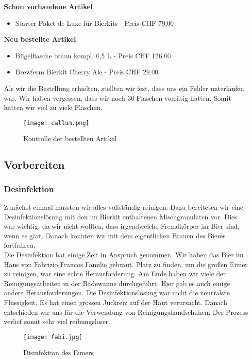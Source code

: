 \textbf{Schon vorhandene Artikel}
\begin{itemize}
	\item Starter-Paket de Luxe für Bierkits - Preis CHF 79.00
\end{itemize}
\textbf{Neu bestellte Artikel}
\begin{itemize}
	\item Bügelflasche braun kompl. 0,5 L - Preis CHF 126.00
	\item Brewferm Bierkit Cherry Ale - Preis CHF 29.00
\end{itemize}

Als wir die Bestellung erhielten, stellten wir fest, dass uns ein Fehler unterlaufen war.
Wir haben vergessen, dass wir noch 30 Flaschen vorrätig hatten.
Somit hatten wir viel zu viele Flaschen.

 \begin{figure}[!h]
	\centering
	\texttt{[image: callum.png]}
	\caption{Kontrolle der bestellten Artikel}
\end{figure}
\newpage
\subsection{Vorbereiten}
\subsubsection{Desinfektion}
Zunächst einmal mussten wir alles vollständig reinigen.
Dazu bereiteten wir eine Desinfektionslösung mit den im Bierkit enthaltenen Mischgranulaten vor.
Dies war wichtig, da wir nicht wollten, dass irgendwelche Fremdkörper im Bier sind, wenn es gärt.
Danach konnten wir mit dem eigentlichen Brauen des Bieres fortfahren. \\

Die Desinfektion hat einige Zeit in Anspruch genommen. Wir haben das Bier im Haus von Fabrizio Francos Familie gebraut.
Platz zu finden, um die großen Eimer zu reinigen,
war eine echte Herausforderung. Am Ende haben wir viele der Reinigungsarbeiten in der Badewanne durchgeführt.
Hier gab es auch einige andere Herausforderungen. Die Desinfektionslösung war nicht die neutralste Flüssigkeit.
Es hat einen grossen Juckreiz auf der Haut verursacht. Danach entschieden wir uns für die Verwendung von Reinigungshandschuhen.
Der Prozess verlief somit sehr viel reibungsloser.


\begin{figure}[!h]
	\centering
	\texttt{[image: fabi.jpg]}
	\caption{Disinfektion des Eimers}
\end{figure}

